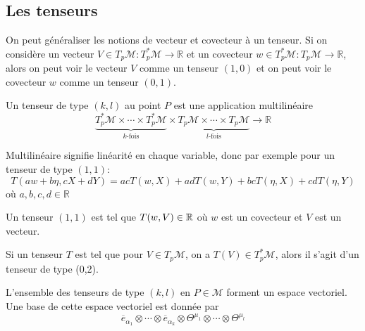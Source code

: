 \subsection{Les tenseurs}

On peut généraliser les notions de vecteur et covecteur à un tenseur. Si on considère un vecteur $V \in T_{p}\mathcal{M} : T^*_{p}\mathcal{M} \rightarrow \mathbb{R}$ et un covecteur $w \in T^*_{p}\mathcal{M} : T_{p}\mathcal{M} \rightarrow \mathbb{R}$, alors on peut voir le vecteur $V$ comme un tenseur $(1, 0)$ et on peut voir le covecteur $w$ comme un tenseur $(0, 1)$. 
\begin{theoremframe}
    \begin{defi}
        Un tenseur de type $(k, l)$ au point $P$ est une application multilinéaire
        \begin{equation}
            \underbrace{T^*_{p}\mathcal{M} \times \cdots \times T^*_{p}\mathcal{M}}_\text{$k$-fois} \times \underbrace{T_{p}\mathcal{M} \times \cdots \times T_{p}\mathcal{M}}_\text{$l$-fois}  \to \mathbb{R}
        \end{equation}

        Multilinéaire signifie linéarité en chaque variable, donc par exemple pour un tenseur de type $(1,1)$: 
        \begin{equation}
        T(aw +b\eta, cX +dY) = acT(w, X) + adT(w, Y) + bcT(\eta, X) +cdT(\eta, Y)
        \end{equation}
        où $a,b, c ,d \in \mathbb{R}$
    \end{defi}
\end{theoremframe}
\begin{exmp}
    Un tenseur $(1, 1)$ est tel que $T(w,V) \in \mathbb{R}$ où $w$ est un covecteur et $V$ est un vecteur. 
\end{exmp}
\begin{exmp}
    Si un tenseur $T$ est tel que pour $V\in T_p\mathcal{M}$, on a $T(V) \in T^*_p\mathcal{M}$, alors il s'agit d'un tenseur de type (0,2).
\end{exmp}
\begin{theoremframe}
    \begin{propri}
        L'ensemble des tenseurs de type $(k, l)$ en $P\in \mathcal{M}$ forment un espace vectoriel. Une base de cette espace vectoriel est donnée par 
        \begin{equation}
        \overline{e}_{\alpha_1} \otimes \cdots \otimes \overline{e}_{\alpha_k} \otimes \Theta^{\mu _1}\otimes \cdots \otimes \Theta^{\mu _l}
        \end{equation}
    \end{propri}
\end{theoremframe}
